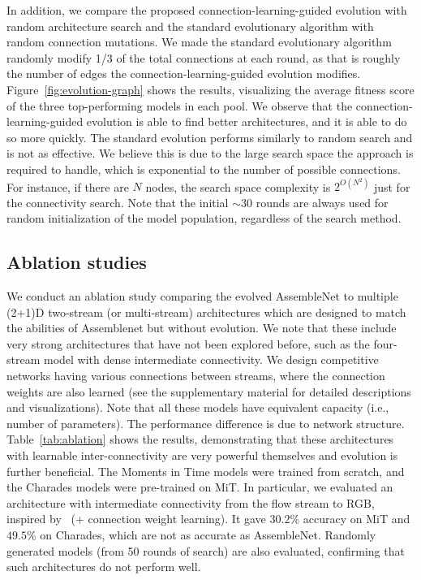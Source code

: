 \documentclass{article} \usepackage{iclr2020_conference,times}
\begin{document}
In addition, we compare the proposed connection-learning-guided evolution with random architecture search and the standard evolutionary algorithm with random connection mutations. We made the standard evolutionary algorithm randomly modify 1/3 of the total connections at each round, as that is roughly the number of edges the connection-learning-guided evolution modifies. 
Figure~\ref{fig:evolution-graph} shows the results, visualizing the average fitness score of the three top-performing models in each pool. We observe that the connection-learning-guided evolution is able to find better architectures, and it is able to do so more quickly. The standard evolution performs similarly to random search and is not as effective. We believe this is due to the large search space the approach is required to handle, which is exponential to the number of possible connections. For instance, if there are $N$ nodes, the search space complexity is $2^{O(N^2)}$ just for the connectivity search. Note that the initial $\sim$30 rounds are always used for random initialization of the model population, regardless of the search method.





\vspace{-5pt}
\subsection{Ablation studies}
\vspace{-5pt}

We conduct an ablation study comparing the evolved AssembleNet to multiple (2+1)D two-stream (or multi-stream) architectures which are designed to match the abilities of Assemblenet but without evolution. 
We note that these include very strong architectures that have not been explored before, such as the four-stream model with dense intermediate connectivity. 
We design competitive networks having various connections between streams, where the connection weights are also learned (see the supplementary material for detailed descriptions and visualizations). Note that all these models have equivalent capacity (i.e., number of parameters). The performance difference is due to network structure.
Table~\ref{tab:ablation} shows the results, demonstrating that these architectures with learnable inter-connectivity are very powerful themselves and evolution is further beneficial. The Moments in Time models were trained from scratch, and the Charades models were pre-trained on MiT. In particular, we evaluated an architecture with intermediate connectivity from the flow stream to RGB, inspired by~\cite{feichtenhofer2016convolutional,feichtenhofer2018slowfast} (+ connection weight learning). It gave $30.2$\% accuracy on MiT and $49.5$\% on Charades, which are not as accurate as AssembleNet.
Randomly generated models (from 50 rounds of search) are also evaluated, confirming that such architectures do not perform well. 
\end{document}
